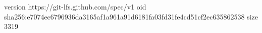 version https://git-lfs.github.com/spec/v1
oid sha256:e7074ec6796936da3165af1a961a91d6181fa03fd31fe4cd51cf2ec635862538
size 3319
